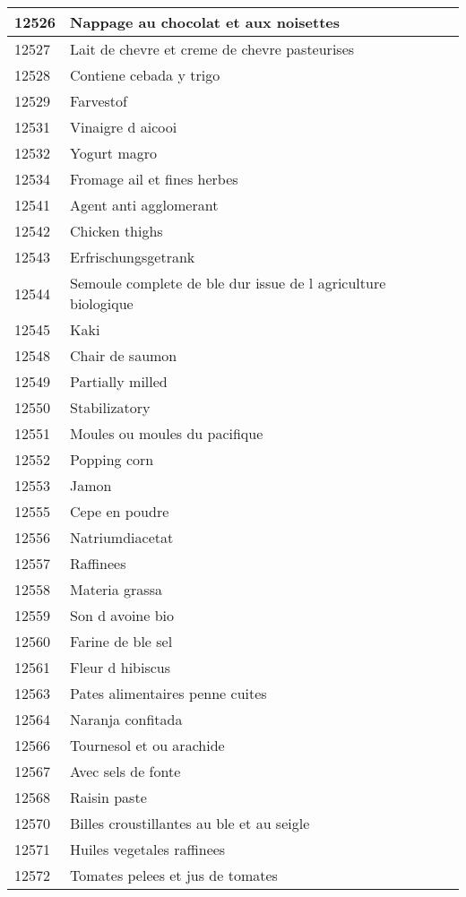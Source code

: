 \begin{longtable}{|l|l|}
12526 & Nappage au chocolat et aux noisettes \\ \hline 
12527 & Lait de chevre et creme de chevre pasteurises \\ \hline 
12528 & Contiene cebada y trigo \\ \hline 
12529 & Farvestof \\ \hline 
12531 & Vinaigre d aicooi \\ \hline 
12532 & Yogurt magro \\ \hline 
12534 & Fromage ail et fines herbes \\ \hline 
12541 & Agent anti agglomerant \\ \hline 
12542 & Chicken thighs \\ \hline 
12543 & Erfrischungsgetrank \\ \hline 
12544 & Semoule complete de ble dur issue de l agriculture biologique \\ \hline 
12545 & Kaki \\ \hline 
12548 & Chair de saumon \\ \hline 
12549 & Partially milled \\ \hline 
12550 & Stabilizatory \\ \hline 
12551 & Moules ou moules du pacifique \\ \hline 
12552 & Popping corn \\ \hline 
12553 & Jamon \\ \hline 
12555 & Cepe en poudre \\ \hline 
12556 & Natriumdiacetat \\ \hline 
12557 & Raffinees \\ \hline 
12558 & Materia grassa \\ \hline 
12559 & Son d avoine bio \\ \hline 
12560 & Farine de ble sel \\ \hline 
12561 & Fleur d hibiscus \\ \hline 
12563 & Pates alimentaires penne cuites \\ \hline 
12564 & Naranja confitada \\ \hline 
12566 & Tournesol et ou arachide \\ \hline 
12567 & Avec sels de fonte \\ \hline 
12568 & Raisin paste \\ \hline 
12570 & Billes croustillantes au ble et au seigle \\ \hline 
12571 & Huiles vegetales raffinees \\ \hline 
12572 & Tomates pelees et jus de tomates \\ \hline 

\end{longtable}

